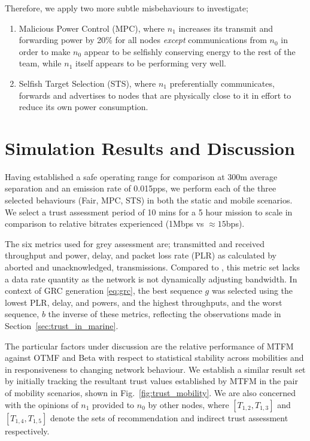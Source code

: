 Therefore, we apply two more subtle misbehaviours to investigate; 
\begin{enumerate}
	\item Malicious Power Control (MPC), where $n_1$ increases its transmit and forwarding power by 20\% for all nodes \emph{except} communications from $n_0$ in order to make $n_0$ appear to be selfishly conserving energy to the rest of the team, while $n_1$ itself appears to be performing very well.
	\item Selfish Target Selection (STS), where $n_1$ preferentially communicates, forwards and advertises to nodes that are physically close to it in effort to reduce its own power consumption.
\end{enumerate}


\section{Simulation Results and Discussion}\label{sec:trustresultsanddiscussion}

Having established a safe operating range for comparison at 300m average separation and an emission rate of 0.015pps, we perform each of the three selected behaviours (Fair, MPC, STS) in both the static and mobile scenarios. 
We select a trust assessment period of 10 mins for a 5 hour mission to scale in comparison to relative bitrates experienced (1Mbps vs $\approx15$bps).

The six metrics used for grey assessment are; transmitted and received throughput and power, delay, and packet loss rate (PLR) as calculated by aborted and unacknowledged, transmissions.
Compared to \cite{Guo11}, this metric set lacks a data rate quantity as the network is not dynamically adjusting bandwidth.
In context of GRC generation \eqref{eq:grc}, the best sequence $g$ was selected using the lowest PLR, delay, and powers, and the highest throughputs, and the worst sequence, $b$ the inverse of these metrics, reflecting the observations made in Section~\ref{sec:trust_in_marine}.

The particular factors under discussion are the relative performance of MTFM against OTMF and Beta with respect to statistical stability across mobilities and in responsiveness to changing network behaviour. 
We establish a similar result set by initially tracking the resultant trust values established by MTFM in the pair of mobility scenarios, shown in Fig.~\ref{fig:trust_mobility}.
We are also concerned with the opinions of $n_1$ provided to $n_0$ by other nodes, where $[T_{1,2},T_{1,3}]$ and $[T_{1,4},T_{1,5}]$ denote the sets of recommendation and indirect trust assessment respectively.

